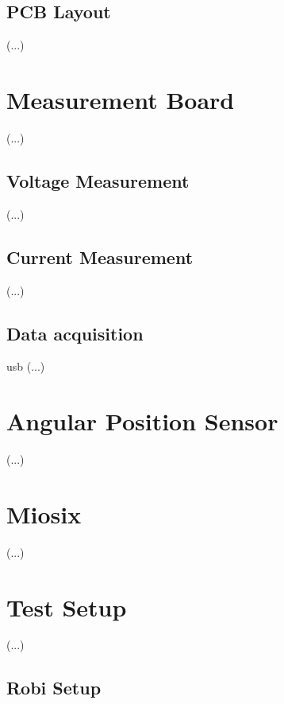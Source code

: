 \subsection{PCB Layout}

(...)\\


\section{Measurement Board}

(...)\\

\subsection{Voltage Measurement}

(...)\\

\subsection{Current Measurement}

(...)\\

\subsection{Data acquisition}
usb
(...)\\

\section{Angular Position Sensor}

(...)\\

\section{Miosix}

(...)\\

\section{Test Setup}

(...)\\

\subsection{Robi Setup}

